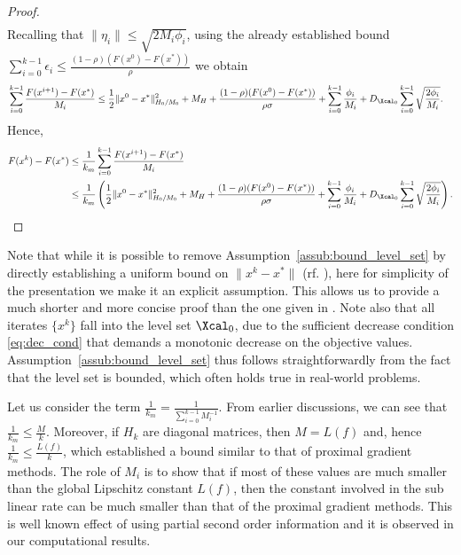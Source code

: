 \documentclass[11pt]{article}
\numberwithin{equation}{section}
\begin{document}
\begin{proof}
\begin{align*}
         \end{align*}
         Recalling that  $\|\eta_i\|\leq \sqrt{2M_i\phi_i}$, using the already established bound $\sum_{i=0}^{k-1}\epsilon_i \leq \frac{(1-\rho)(F(x^0)-F(x^*))}{\rho}$ we obtain
          \begin{align*}
         &\sum_{i=0}^{k-1} \frac{F(x^{i+1}) - F(x^*)}{M_i}\leq
         \frac{1}{2} \|x^0-x^*\|_{H_0/M_0}^2 +M_H
         + \frac{(1-\rho)(F(x^0)-F(x^*))}{\rho\sigma} 
         + \sum_{i=0}^{k-1}\frac{\phi_i}{M_i}
         + D_{\Xcal_0}\sum_{i=0}^{k-1} \sqrt{\frac{2\phi_i}{M_i}}.
     \end{align*}
     Hence,
     \begin{align*}
         F(x^k) - F(x^*) &\leq \frac{1}{k_m}\sum_{i=0}^{k-1} \frac{F(x^{i+1}) - F(x^*)}{M_i}\\        
         &\leq \frac{1}{k_m} \left( \frac{1}{2} \|x^0-x^*\|_{H_0/M_0}^2 +M_H
         + \frac{(1-\rho)(F(x^0)-F(x^*))}{\rho\sigma} 
         + \sum_{i=0}^{k-1}\frac{\phi_i}{M_i}
         + D_{\Xcal_0}\sum_{i=0}^{k-1} \sqrt{\frac{2\phi_i}{M_i}} \right).
     \end{align*}
 \end{proof}

 

Note that while it is possible to remove Assumption~\ref{assub:bound_level_set} by directly establishing a uniform bound on $\|x^k - x^*\|$ (rf. \cite{OML,Schmidtetal}), here for simplicity of the presentation we make it an explicit assumption. This allows us to provide a much shorter and more concise proof than the one given in \cite{OML}. 
Note also that all iterates $\{x^k\}$ fall into the level set $\Xcal_0$, due to the sufficient decrease condition \eqref{eq:dec_cond} that demands a monotonic decrease on the objective values. Assumption~\ref{assub:bound_level_set} thus follows straightforwardly from the fact that the level set is bounded, which often holds true in real-world problems.

Let us consider the term $\frac{1}{k_m}=\frac{1}{\sum_{i=0}^{k-1}M_i^{-1}}$. From earlier discussions, we can see that 
$\frac{1}{k_m}\leq\frac{M}{k}$. Moreover, if $H_k$ are diagonal matrices, then $M=L(f)$ and, hence $\frac{1}{k_m}\leq\frac{L(f)}{k}$,
which established a bound similar to that of proximal gradient methods. The role of $M_i$ is to show that if most of these values are much smaller than the global Lipschitz constant $L(f)$, then the constant involved in the sub linear rate can be much smaller than that of the proximal gradient methods.
This is  well known effect of using partial second order information and it is observed in our computational results. 
\end{document}
